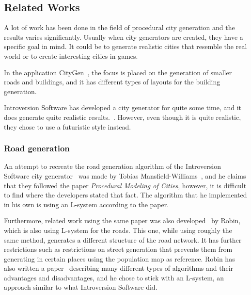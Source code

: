 \subsection{Related Works}
A lot of work has been done in the field of procedural city generation and the results varies significantly.
Usually when city generators are created, they have a specific goal in mind.
It could be to generate realistic cities that resemble the real world or to create interesting cities in games.

In the application CityGen~\cite{citygen}, the focus is placed on the generation of smaller roads and buildings, and it has different types of layouts for the building generation.

Introversion Software has developed a city generator for quite some time, and it does generate quite realistic results.~\cite{citygen_subversion}. However, even though it is quite realistic, they chose to use a futuristic style instead.



\subsubsection{Road generation}


An attempt to recreate the road generation algorithm of the Introversion Software city generator~\cite{citygen_subversion} was made by Tobias Mansfield-Williams~\cite{citygen_tobias}, and he claims that they followed the paper \textit{Procedural Modeling of Cities}, however, it is difficult to find where the developers stated that fact.
The algorithm that he implemented in his own is using an L-system according to the paper.

Furthermore, related work using the same paper was also developed~\cite{citygen_robin} by Robin, which is also using L-system for the roads. This one, while using roughly the same method, generates a different structure of the road network. It has further restrictions such as restrictions on street generation that prevents them from generating in certain places using the population map as reference.
Robin has also written a paper~\cite{citygen_robin_paper} describing many different types of algorithms and their advantages and disadvantages, and he chose to stick with an L-system, an approach similar to what Introversion Software did.

